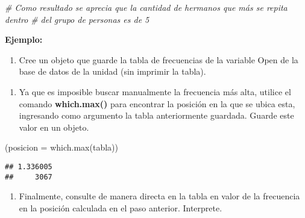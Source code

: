 \documentclass[
]{book}
\newenvironment{Shaded}{\begin{snugshade}}{\end{snugshade}}
\newcommand{\AttributeTok}[1]{\textcolor[rgb]{0.77,0.63,0.00}{#1}}
\newcommand{\CommentTok}[1]{\textcolor[rgb]{0.56,0.35,0.01}{\textit{#1}}}
\newcommand{\FunctionTok}[1]{\textcolor[rgb]{0.00,0.00,0.00}{#1}}
\newcommand{\NormalTok}[1]{#1}
\newcommand{\OtherTok}[1]{\textcolor[rgb]{0.56,0.35,0.01}{#1}}
\newcommand{\SpecialCharTok}[1]{\textcolor[rgb]{0.00,0.00,0.00}{#1}}
\providecommand{\tightlist}{%
  \setlength{\itemsep}{0pt}\setlength{\parskip}{0pt}}
\begin{document}
\begin{Shaded}
\begin{Highlighting}[]
\CommentTok{\# Como resultado se aprecia que la cantidad de hermanos que más se repita dentro }
\CommentTok{\# del grupo de personas es de 5}
\end{Highlighting}
\end{Shaded}

\textbf{Ejemplo:}

\begin{enumerate}
\def\labelenumi{\arabic{enumi}.}
\tightlist
\item
  Cree un objeto que guarde la tabla de frecuencias de la variable Open de la base de datos de la unidad (sin imprimir la tabla).
\end{enumerate}

\begin{Shaded}
\end{Shaded}

\begin{enumerate}
\def\labelenumi{\arabic{enumi}.}
\setcounter{enumi}{1}
\tightlist
\item
  Ya que es imposible buscar manualmente la frecuencia más alta, utilice el comando \textbf{which.max()} para encontrar la posición en la que se ubica esta, ingresando como argumento la tabla anteriormente guardada. Guarde este valor en un objeto.
\end{enumerate}

\begin{Shaded}
\begin{Highlighting}[]
\NormalTok{(}\AttributeTok{posicion =} \FunctionTok{which.max}\NormalTok{(tabla))}
\end{Highlighting}
\end{Shaded}

\begin{verbatim}
## 1.336005 
##     3067
\end{verbatim}

\begin{enumerate}
\def\labelenumi{\arabic{enumi}.}
\setcounter{enumi}{2}
\tightlist
\item
  Finalmente, consulte de manera directa en la tabla en valor de la frecuencia en la posición calculada en el paso anterior. Interprete.
\end{enumerate}
\end{document}
